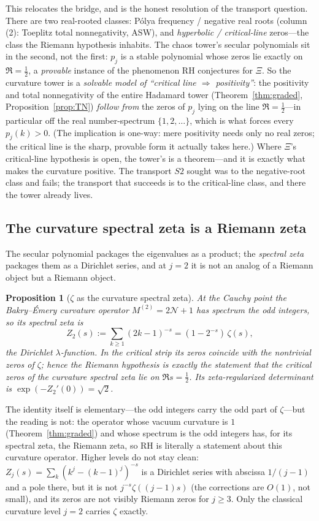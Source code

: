 \documentclass[11pt,reqno]{amsart}
\theoremstyle{plain}
\newtheorem{proposition}[theorem]{Proposition}
\theoremstyle{definition}
\theoremstyle{remark}
\begin{document}
This relocates the bridge, and is the honest resolution of the transport
question. There are two real-rooted classes: P\'olya frequency / negative
real roots (column (2): Toeplitz total nonnegativity, ASW), and
\emph{hyperbolic / critical-line} zeros---the class the Riemann hypothesis
inhabits. The chaos tower's secular polynomials sit in the second, not the
first: $p_j$ is a stable polynomial whose zeros lie exactly on
$\Re=\tfrac12$, a \emph{provable} instance of the phenomenon RH conjectures
for $\Xi$. So the curvature tower is a \emph{solvable model of ``critical
line $\Rightarrow$ positivity''}: the positivity and total nonnegativity of
the entire Hadamard tower (Theorem~\ref{thm:graded},
Proposition~\ref{prop:TN}) \emph{follow from} the zeros of $p_j$ lying on
the line $\Re=\tfrac12$---in particular off the real number-spectrum
$\{1,2,\dots\}$, which is what forces every $p_j(k)>0$. (The implication is
one-way: mere positivity needs only no real zeros; the critical line is the
sharp, provable form it actually takes here.) Where $\Xi$'s critical-line
hypothesis is open, the
tower's is a theorem---and it is exactly what makes the curvature positive.
The transport $S2$ sought was to the negative-root class and fails; the
transport that succeeds is to the critical-line class, and there the tower
already lives.

\subsection{The curvature spectral zeta is a Riemann zeta}\label{sec:czeta}
The secular polynomial packages the eigenvalues as a product; the
\emph{spectral zeta} packages them as a Dirichlet series, and at $j=2$ it
is not an analog of a Riemann object but a Riemann object.

\begin{proposition}[$\zeta$ as the curvature spectral zeta]\label{prop:czeta}
At the Cauchy point the Bakry--\'Emery curvature operator
$M^{(2)}=2\mathcal N+1$ has spectrum the odd integers, so its spectral zeta
is
\[
   Z_2(s):=\sum_{k\ge1}(2k-1)^{-s}=(1-2^{-s})\,\zeta(s),
\]
the Dirichlet $\lambda$-function. In the critical strip its zeros coincide
with the nontrivial zeros of $\zeta$; hence the Riemann hypothesis is
exactly the statement that the critical zeros of the curvature spectral
zeta lie on $\Re s=\tfrac12$. Its zeta-regularized determinant is
$\exp(-Z_2'(0))=\sqrt2$.
\end{proposition}

The identity itself is elementary---the odd integers carry the odd part of
$\zeta$---but the reading is not: the operator whose vacuum curvature is
$1$ (Theorem~\ref{thm:graded}) and whose spectrum is the odd integers has,
for its spectral zeta, the Riemann zeta, so RH is literally a statement
about this curvature operator. Higher levels do not stay clean:
$Z_j(s)=\sum_k(k^j-(k-1)^j)^{-s}$ is a Dirichlet series with abscissa
$1/(j-1)$ and a pole there, but it is not $j^{-s}\zeta((j-1)s)$ (the
corrections are $O(1)$, not small), and its zeros are not visibly Riemann
zeros for $j\ge3$. Only the classical curvature level $j=2$ carries $\zeta$
exactly.
\end{document}
